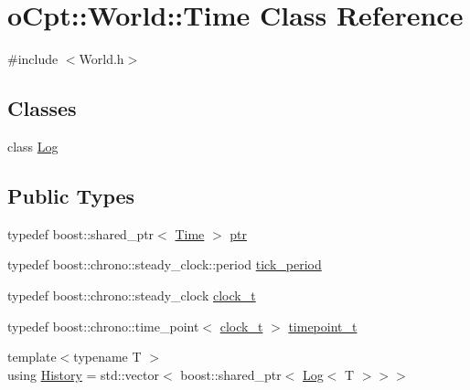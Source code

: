 \hypertarget{classo_cpt_1_1_world_1_1_time}{}\section{o\+Cpt\+:\+:World\+:\+:Time Class Reference}
\label{classo_cpt_1_1_world_1_1_time}


{\ttfamily \#include $<$World.\+h$>$}

\subsection*{Classes}
\begin{DoxyCompactItemize}
\item 
class \hyperlink{classo_cpt_1_1_world_1_1_time_1_1_log}{Log}
\end{DoxyCompactItemize}
\subsection*{Public Types}
\begin{DoxyCompactItemize}
\item 
typedef boost\+::shared\+\_\+ptr$<$ \hyperlink{classo_cpt_1_1_world_1_1_time}{Time} $>$ \hyperlink{classo_cpt_1_1_world_1_1_time_ae99716d20374e14ec5053765a9921ef2}{ptr}
\item 
typedef boost\+::chrono\+::steady\+\_\+clock\+::period \hyperlink{classo_cpt_1_1_world_1_1_time_a8191b46c075d8d9ec6db0588797b59a5}{tick\+\_\+period}
\item 
typedef boost\+::chrono\+::steady\+\_\+clock \hyperlink{classo_cpt_1_1_world_1_1_time_ac41de01610f32d0ace4844ed3bf454f7}{clock\+\_\+t}
\item 
typedef boost\+::chrono\+::time\+\_\+point$<$ \hyperlink{classo_cpt_1_1_world_1_1_time_ac41de01610f32d0ace4844ed3bf454f7}{clock\+\_\+t} $>$ \hyperlink{classo_cpt_1_1_world_1_1_time_a6a6e782c3c90622c1c7070b0a223ec4c}{timepoint\+\_\+t}
\item 
{\footnotesize template$<$typename T $>$ }\\using \hyperlink{classo_cpt_1_1_world_1_1_time_a7c51955f1bccc0f26b8a3d35599b6135}{History} = std\+::vector$<$ boost\+::shared\+\_\+ptr$<$ \hyperlink{classo_cpt_1_1_world_1_1_time_1_1_log}{Log}$<$ T $>$$>$$>$
\end{DoxyCompactItemize}
